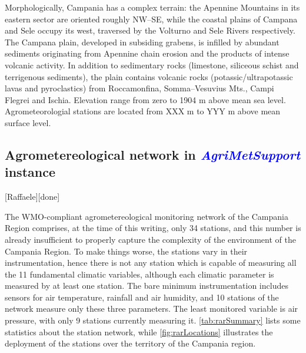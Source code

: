 \documentclass[authoryear,preprint,review,12pt]{elsarticle}
\newcommand{\update}[1]{\emph{\textcolor{blue}{#1}}}
\newcommand{\gci}{\update{AgriMetSupport}\xspace}
\begin{document}
    Morphologically, Campania has a complex terrain: the Apennine Mountains in its eastern sector are oriented roughly NW–SE, while the coastal plains of Campana and Sele occupy its west, traversed by the Volturno and Sele Rivers respectively.
    The Campana plain, developed in subsiding grabens, is infilled by abundant sediments originating from Apennine chain erosion and the products of intense volcanic activity.
    In addition to sedimentary rocks (limestone, siliceous schist and terrigenous sediments), the plain contains volcanic rocks (potassic/ultrapotassic lavas and pyroclastics) from Roccamonfina, Somma–Vesuvius Mts., Campi Flegrei and Ischia.
    Elevation range from zero to 1904 m above mean sea level.
    Agrometeorologial stations are located from XXX m to YYY m above mean surface level.

\subsection{Agrometereological network in \gci instance \label{RARStructure}}[Raffaele][done]

The WMO-compliant agrometereological monitoring network of the Campania Region comprises, at the time of this writing, only 34 stations, and this number is already insufficient to properly capture the complexity of the environment of the Campania Region. To make things worse, the stations vary in their instrumentation, hence there is not any station which is capable of measuring all the 11 fundamental climatic variables, although each climatic parameter is measured by at least one station. The bare minimum instrumentation includes sensors for air temperature, rainfall and air humidity, and 10 stations of the network measure only these three parameters. The least monitored variable is air pressure, with only 9 stations currently measuring it. \cref{tab:rarSummary} lists some statistics about the station network, while \cref{fig:rarLocations} illustrates the deployment of the stations over the territory of the Campania region.
\end{document}
